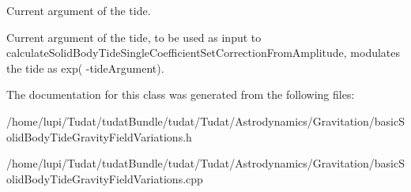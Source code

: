 Current argument of the tide. 

Current argument of the tide, to be used as input to calculate\+Solid\+Body\+Tide\+Single\+Coefficient\+Set\+Correction\+From\+Amplitude, modulates the tide as exp( -\/tide\+Argument). 

The documentation for this class was generated from the following files\+:\begin{DoxyCompactItemize}
\item 
/home/lupi/\+Tudat/tudat\+Bundle/tudat/\+Tudat/\+Astrodynamics/\+Gravitation/basic\+Solid\+Body\+Tide\+Gravity\+Field\+Variations.\+h\item 
/home/lupi/\+Tudat/tudat\+Bundle/tudat/\+Tudat/\+Astrodynamics/\+Gravitation/basic\+Solid\+Body\+Tide\+Gravity\+Field\+Variations.\+cpp\end{DoxyCompactItemize}
